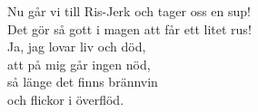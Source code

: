 \par
\vspace{10pt}
Nu går vi till Ris-Jerk och tager oss en sup!\\
Det gör så gott i magen att får ett litet rus!\\
\revrpt Ja, jag lovar liv och död,\\
att på mig går ingen nöd,\\
så länge det finns brännvin\\
och flickor i överflöd.\rpt
